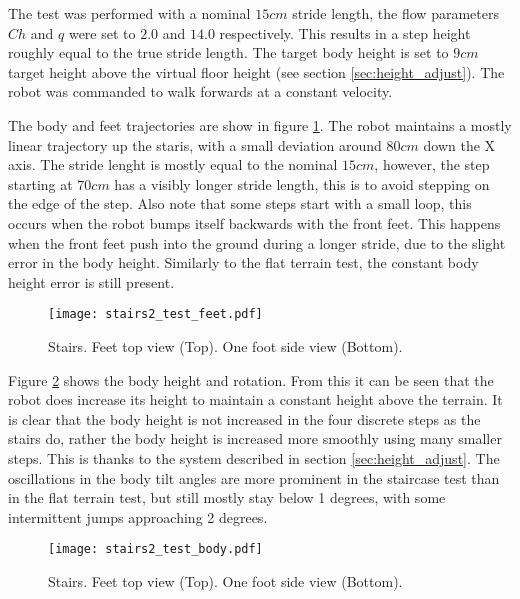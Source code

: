     \noindent
    The test was performed with a nominal \(15cm\) stride length, the flow parameters \(Ch\) and \(q\) were set to \(2.0\) and \(14.0\) respectively. This results in a step height roughly equal to the true stride length. The target body height is set to \(9cm\) target height above the virtual floor height (see section \ref{sec:height_adjust}). The robot was commanded to walk forwards at a constant velocity.

    The body and feet trajectories are show in figure \ref{fig:stairs_feet}. The robot maintains a mostly linear trajectory up the staris, with a small deviation around \(80cm\) down the X axis. The stride lenght is mostly equal to the nominal \(15cm\), however, the step starting at \(70cm\) has a visibly longer stride length, this is to avoid stepping on the edge of the step. Also note that some steps start with a small loop, this occurs when the robot bumps itself backwards with the front feet. This happens when the front feet push into the ground during a longer stride, due to the slight error in the body height. Similarly to the flat terrain test, the constant body height error is still present. 
    \begin{figure}[h]
        \centering
        \texttt{[image: stairs2\_test\_feet.pdf]}
        \caption{Stairs. Feet top view (Top). One foot side view (Bottom).}
        \label{fig:stairs_feet}
    \end{figure}

    \noindent
    Figure \ref{fig:stairs_body} shows the body height and rotation. From this it can be seen that the robot does increase its height to maintain a constant height above the terrain. It is clear that the body height is not increased in the four discrete steps as the stairs do, rather the body height is increased more smoothly using many smaller steps. This is thanks to the system described in section \ref{sec:height_adjust}.
    The oscillations in the body tilt angles are more prominent in the staircase test than in the flat terrain test, but still mostly stay below 1 degrees, with some intermittent jumps approaching 2 degrees.
    \begin{figure}[h]
        \centering
        \texttt{[image: stairs2\_test\_body.pdf]}
        \caption{Stairs. Feet top view (Top). One foot side view (Bottom).}
        \label{fig:stairs_body}
    \end{figure}


